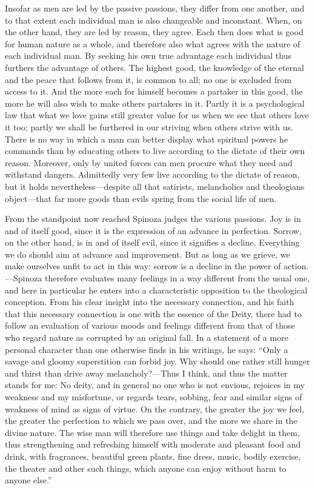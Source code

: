 \documentclass[12pt]{book}
\newcommand{\opage}[1]{\marginnote{\footnotesize\textit{[#1]}}}
\begin{document}
Insofar as men are led by the passive passions, they differ from one another, and to
that extent each \opage{135}individual man is also changeable and inconstant. When, on
the other hand, they are led by reason, they agree. Each then does what is good for human
nature as a whole, and therefore also what agrees with the nature of each individual man.
By seeking his own true advantage each individual thus furthers the advantage of others.
The highest good, the knowledge of the eternal and the peace that follows from it, is
common to all; no one is excluded from access to it. And the more each for himself
becomes a partaker in this good, the more he will also wish to make others partakers in
it. Partly it is a psychological law that what we love gains still greater value for us
when we see that others love it too; partly we shall be furthered in our striving when
others strive with us. There is no way in which a man can better display what spiritual
powers he commands than by educating others to live according to the dictate of their
own reason. Moreover, only by united forces can men procure what they need and withstand
dangers. Admittedly very few live according to the dictate of reason, but it holds
nevertheless---despite all that satirists, melancholics and theologians object---that
far more goods than evils spring from the social life of men.

From the standpoint now reached Spinoza judges the various passions. Joy is in and of
itself good, since it is the expression of an advance in perfection. Sorrow, on the other
hand, is in and of itself evil, since it signifies a decline. Everything we do should aim
at advance and improvement. But as long as we grieve, we make ourselves unfit to act in
this way: sorrow \opage{136}is a decline in the power of action.---Spinoza therefore
evaluates many feelings in a way different from the usual one, and here in particular he
enters into a characteristic opposition to the theological conception. From his clear
insight into the necessary connection, and his faith that this necessary connection is
one with the essence of the Deity, there had to follow an evaluation of various moods
and feelings different from that of those who regard nature as corrupted by an original
fall. In a statement of a more personal character than one otherwise finds in his
writings, he says: ``Only a savage and gloomy superstition can forbid joy. Why should one
rather still hunger and thirst than drive away melancholy?---Thus I think, and thus the
matter stands for me: No deity, and in general no one who is not envious, rejoices in my
weakness and my misfortune, or regards tears, sobbing, fear and similar signs of
weakness of mind as signs of virtue. On the contrary, the greater the joy we feel, the
greater the perfection to which we pass over, and the more we share in the divine
nature. The wise man will therefore use things and take delight in them, thus
strengthening and refreshing himself with moderate and pleasant food and drink, with
fragrances, beautiful green plants, fine dress, music, bodily exercise, the theater and
other such things, which anyone can enjoy without harm to anyone else.''
\end{document}
